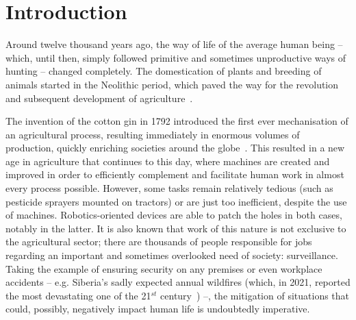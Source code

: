 




\chapter{Introduction}\label{cha:chapter1_Introduction}

Around twelve thousand years ago, the way of life of the average human being -- which, until then, simply followed primitive and sometimes unproductive ways of hunting -- changed completely. The domestication of plants and breeding of animals started in the Neolithic period, which paved the way for the revolution and subsequent development of agriculture~\cite{Zeder2011TheOO}.

The invention of the cotton gin in 1792 introduced the first ever mechanisation of an agricultural process, resulting immediately in enormous volumes of production, quickly enriching societies around the globe~\cite{Roe1926}.
This resulted in a new age in agriculture that continues to this day, where machines are created and improved in order to efficiently complement and facilitate human work in almost every process possible.
However, some tasks remain relatively tedious (such as pesticide sprayers mounted on tractors) or are just too inefficient, despite the use of machines. Robotics-oriented devices are able to patch the holes in both cases, notably in the latter.
It is also known that work of this nature is not exclusive to the agricultural sector; there are thousands of people responsible for jobs regarding an important and sometimes overlooked need of society: surveillance.
Taking the example of ensuring security on any premises or even workplace accidents -- e.g. Siberia's sadly expected annual wildfires (which, in 2021, reported the most devastating one of the 21$^{st}$ century~\cite{dixon_2021}) --, the mitigation of situations that could, possibly, negatively impact human life is undoubtedly imperative.

